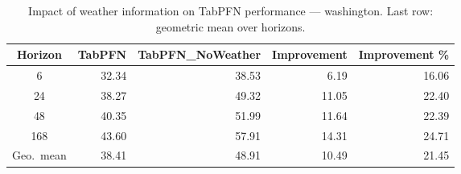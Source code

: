 \begin{table}
\centering
\caption{Impact of weather information on TabPFN performance — washington. Last row: geometric mean over horizons.}
\label{tab:tabpfn_weather_washington}
\begin{tabular}{crrrr}
\toprule
Horizon & TabPFN & TabPFN\_NoWeather & Improvement & Improvement \% \\
\midrule
6 & 32.34 & 38.53 & 6.19 & 16.06 \\
24 & 38.27 & 49.32 & 11.05 & 22.40 \\
48 & 40.35 & 51.99 & 11.64 & 22.39 \\
168 & 43.60 & 57.91 & 14.31 & 24.71 \\
\midrule
Geo.\ mean & 38.41 & 48.91 & 10.49 & 21.45 \\
\bottomrule
\end{tabular}
\end{table}
